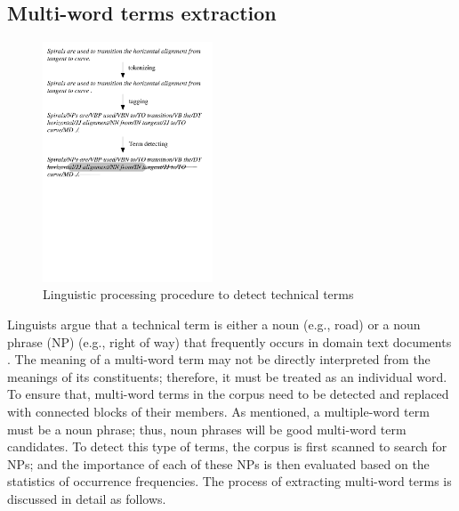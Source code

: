 \documentclass[Journal, BackFigs, DoubleSpace]{ascelike}%
\begin{document}
\subsection{Multi-word terms extraction}
%
\begin{figure}[t]
	\centering
	\includegraphics[width=0.45\textwidth]{Figure2_term_extraction}
	\caption{Linguistic processing procedure to detect technical terms}
	\label{fig:np_detect}
\end{figure}
%
Linguists argue that a technical term is either a noun (e.g., road) or a noun phrase (NP) (e.g., right of way) that frequently occurs in domain text documents \cite{justeson95}. The meaning of a multi-word term may not be directly interpreted from the meanings of its constituents; therefore, it must be treated as an individual word.  To ensure that, multi-word terms in the corpus need to be detected and replaced with connected blocks of their members. As mentioned, a multiple-word term must be a noun phrase; thus, noun phrases will be good multi-word term candidates. To detect this type of terms, the corpus is first scanned to search for NPs; and the importance of each of these NPs is then evaluated based on the statistics of occurrence frequencies. The process of extracting multi-word terms is discussed in detail as follows.  %
\end{document}
